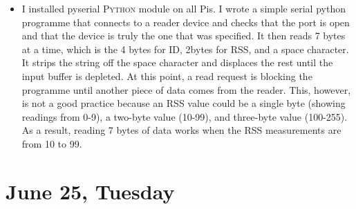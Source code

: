\documentclass[a4paper,12pt]{article}
\begin{document}
\begin{itemize}
	\item I installed \textsf{pyserial} \textsc{Python} module on all Pis. I wrote a simple serial python programme that connects to a reader device and checks that the port is open and that the device is truly the one that was specified. It then reads 7 bytes at a time, which is the 4 bytes for ID, 2bytes for RSS, and a space character. It strips the string off the space character and displaces the rest until the input buffer is depleted. At this point, a read request is blocking the programme until another piece of data comes from the reader. This, however, is not a good practice because an RSS value could be a single byte (showing readings from 0-9), a two-byte value (10-99), and three-byte value (100-255). As a result, reading 7 bytes of data works when the RSS measurements are from 10 to 99.
\end{itemize}

\section{June 25, Tuesday}
\end{document}
